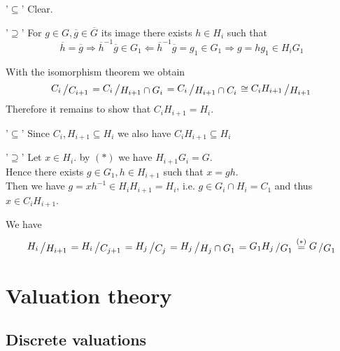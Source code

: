 \documentclass[12pt]{book}
\newcommand{\slant}[2]{{\raisebox{.1em}{$#1$}\left/\raisebox{-.1em}{$#2$}\right.}}
\begin{document}
\begin{spacing}{1.3}
\begin{compactenum}
\begin{compactenum}
\begin{compactenum}
\begin{compactitem}
\item['$\subseteq$'] Clear.
\item['$\supseteq$'] For $g \in G, \overline{g} \in \overline{G}$ its image there exists $h \in H_i$ such that
$$ \overline{h}=\overline{g} \Longrightarrow \overline{h}^{-1}\overline{g} \in G_1 \Longleftarrow \overline{h}^{-1}\overline{g}=g_1 \in G_1 \Longrightarrow g=hg_1 \in H_i G_1$$
\end{compactitem}
With the isomorphism theorem we obtain 
$$\slant{C_i}{C_{i+1}} = \slant{C_i}{H_{i+1} \cap G_i} = \slant{C_i}{H_{i+1}\cap C_i} \cong \slant{C_i H_{i+1}}{H_{i+1}}$$
Therefore it remains to show that $C_i H_{i+1}=H_i$.
\begin{compactitem}
\item['$\subseteq$'] Since $C_i, H_{i+1} \subseteq H_i$ we also have $C_i H_{i+1} \subseteq H_i$
\item['$\supseteq$'] Let $x \in H_i$. by $(*)$ we have $H_{i+1}G_i=G$.\\
Hence there exists $g \in G_1, h \in H_{i+1}$ such that $x=gh$.\\
Then we have $g=x h^{-1} \in H_i H_{i+1}=H_i$, i.e. $g \in G_i \cap H_{i}=C_1$ and thus $x \in C_i H_{i+1}$.
\end{compactitem}
\end{compactenum}
\item We have 
$$\slant{H_i}{H_{i+1}}= \slant{H_i}{C_{j+1}}=\slant{H_j}{C_j}=\slant{H_j}{H_j \cap G_1} = \slant{G_1 H_j}{G_1}\overset{(*)}{=} \slant{G}{G_1}$$
\end{compactenum}
\end{compactenum}



\chapter{Valuation theory}
\thispagestyle{empty}

\setcounter{section}{6}


\renewcommand*\thesection{§ \arabic{section}\quad}
\section{Discrete valuations}
\renewcommand*\thesection{\arabic{section}}


\end{spacing}
\end{document}
